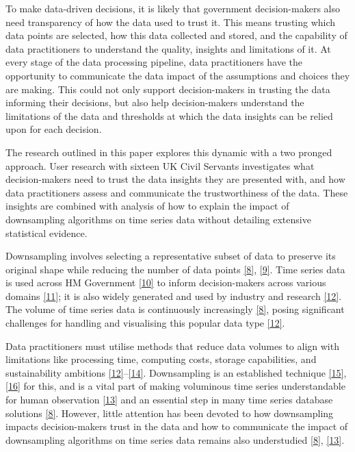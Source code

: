\documentclass{article}
\begin{document}
To make data-driven decisions, it is likely that government
decision-makers also need transparency of how the data used to trust it.
This means trusting which data points are selected, how this data
collected and stored, and the capability of data practitioners to
understand the quality, insights and limitations of it. At every stage
of the data processing pipeline, data practitioners have the opportunity
to communicate the data impact of the assumptions and choices they are
making. This could not only support decision-makers in trusting the data
informing their decisions, but also help decision-makers understand the
limitations of the data and thresholds at which the data insights can be
relied upon for each decision.

The research outlined in this paper explores this dynamic with a two
pronged approach. User research with sixteen UK Civil Servants
investigates what decision-makers need to trust the data insights they
are presented with, and how data practitioners assess and communicate
the trustworthiness of the data. These insights are combined with
analysis of how to explain the impact of downsampling algorithms on time
series data without detailing extensive statistical evidence.

Downsampling involves selecting a representative subset of data to
preserve its original shape while reducing the number of data points
\protect\hyperlink{ref-datapoint}{{[}8{]}},
\protect\hyperlink{ref-MinMaxLTTB}{{[}9{]}}. Time series data is used
across HM Government \protect\hyperlink{ref-pathway}{{[}10{]}} to inform
decision-makers across various domains
\protect\hyperlink{ref-onstool}{{[}11{]}}; it is also widely generated
and used by industry and research
\protect\hyperlink{ref-TVStore}{{[}12{]}}. The volume of time series
data is continuously increasingly
\protect\hyperlink{ref-datapoint}{{[}8{]}}, posing significant
challenges for handling and visualising this popular data type
\protect\hyperlink{ref-TVStore}{{[}12{]}}.

Data practitioners must utilise methods that reduce data volumes to
align with limitations like processing time, computing costs, storage
capabilities, and sustainability ambitions
\protect\hyperlink{ref-TVStore}{{[}12{]}}--\protect\hyperlink{ref-Shift}{{[}14{]}}.
Downsampling is an established technique
\protect\hyperlink{ref-downsampling}{{[}15{]}},
\protect\hyperlink{ref-sampling}{{[}16{]}} for this, and is a vital part
of making voluminous time series understandable for human observation
\protect\hyperlink{ref-Sveinn}{{[}13{]}} and an essential step in many
time series database solutions
\protect\hyperlink{ref-datapoint}{{[}8{]}}. However, little attention
has been devoted to how downsampling impacts decision-makers trust in
the data and how to communicate the impact of downsampling algorithms on
time series data remains also understudied
\protect\hyperlink{ref-datapoint}{{[}8{]}},
\protect\hyperlink{ref-Sveinn}{{[}13{]}}.
\end{document}
